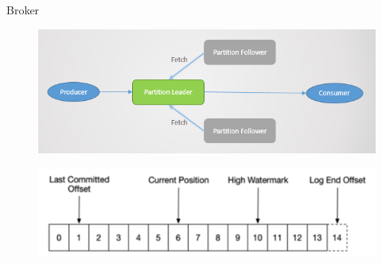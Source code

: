 \begin{frame}[plain,t]{Broker} %
     \\
    \vspace{2ex}
    \begin{figure}
        \centering
        \includegraphics[width=0.8\linewidth]{image/0210}
        \label{fig:0210}
    \end{figure}
     \begin{figure}
        \centering
        \includegraphics[width=0.85\linewidth]{image/0211}
        \label{fig:0211}
    \end{figure}
    
\end{frame}

